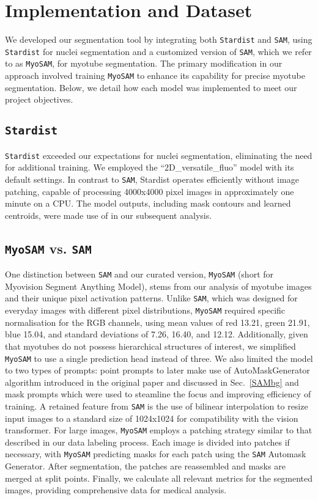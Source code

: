 \section{Implementation and Dataset}\label{secdataset}

We developed our segmentation tool by integrating both \texttt{Stardist} and \texttt{SAM}, using \texttt{Stardist} for nuclei segmentation and a customized version of \texttt{SAM}, which we refer to as \texttt{MyoSAM}, for myotube segmentation. The primary modification in our approach involved training \texttt{MyoSAM} to enhance its capability for precise myotube segmentation. Below, we detail how each model was implemented to meet our project objectives.

\subsection{\texttt{Stardist}}
\texttt{Stardist} exceeded our expectations for nuclei segmentation, eliminating the need for additional training. We employed the ``2D\_versatile\_fluo'' model with its default settings. In contrast to \texttt{SAM}, Stardist operates efficiently without image patching, capable of processing 4000x4000 pixel images in approximately one minute on a CPU. The model outputs, including mask contours and learned centroids, were made use of in our subsequent analysis.

\subsection{\texttt{MyoSAM} vs. \texttt{SAM}}
One distinction between \texttt{SAM} and our curated version, \texttt{MyoSAM} (short for Myovision Segment Anything Model), stems from our analysis of myotube images and their unique pixel activation patterns. Unlike \texttt{SAM}, which was designed for everyday images with different pixel distributions, \texttt{MyoSAM} required specific normalisation for the RGB channels, using mean values of red 13.21, green 21.91, blue 15.04, and standard deviations of 7.26, 16.40, and 12.12. Additionally, given that myotubes do not possess hierarchical structures of interest, we simplified \texttt{MyoSAM} to use a single prediction head instead of three. We also limited the model to two types of prompts: point prompts to later make use of AutoMaskGenerator algorithm introduced in the original paper and discussed in Sec.~\ref{SAMbg} and mask prompts which were used to steamline the focus and improving efficiency of training.
A retained feature from \texttt{SAM} is the use of bilinear interpolation to resize input images to a standard size of 1024x1024 for compatibility with the vision transformer. For large images, \texttt{MyoSAM} employs a patching strategy similar to that described in our data labeling process. Each image is divided into patches if necessary, with \texttt{MyoSAM} predicting masks for each patch using the \texttt{SAM} Automask Generator. After segmentation, the patches are reassembled and masks are merged at split points. Finally, we calculate all relevant metrics for the segmented images, providing comprehensive data for medical analysis.


